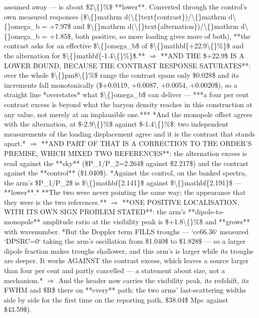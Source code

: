 \begin{description}
assumed away --- is about \$2\textbackslash\{\}\%\$ **lower**. Converted through the control's own measured responses (\$\textbackslash\{\}mathrm d(\textbackslash\{\}text\{contrast\})/\textbackslash\{\}mathrm d\textbackslash\{\}omega\_b = +7.97\$ and \$\textbackslash\{\}mathrm d(\textbackslash\{\}text\{alternation\})/\textbackslash\{\}mathrm d\textbackslash\{\}omega\_b = +1.85\$, both positive, so more loading gives more of both), **the contrast asks for an effective \$\textbackslash\{\}omega\_b\$ of \$\textbackslash\{\}mathbf\{+22.9\textbackslash\{\}\%\}\$ and the alternation for \$\textbackslash\{\}mathbf\{-1.4\textbackslash\{\}\%\}\$.** \ensuremath{\Rightarrow}  **AND THE \$+22.9\$ IS A LOWER BOUND, BECAUSE THE CONTRAST RESPONSE SATURATES**: over the whole \$\textbackslash\{\}pm8\textbackslash\{\}\%\$ range the contrast spans only \$0.028\$ and its increments fall monotonically (\$+0.0119, +0.0087, +0.0054, +0.0020\$), so a straight line *overstates* what \$\textbackslash\{\}omega\_b\$ can deliver --- ***a four per cent contrast excess is beyond what the baryon density reaches in this construction at any value, not merely at an implausible one.***  *And the monopole offset agrees with the alternation, at \$-2.9\textbackslash\{\}\%\$ against \$-1.4\textbackslash\{\}\%\$: two independent measurements of the loading displacement agree and it is the contrast that stands apart.* \ensuremath{\Rightarrow}  **AND PART OF THAT IS A CORRECTION TO THE ORDER'S PREMISE, WHICH MIXED TWO REFERENCES**: the alternation excess is read against the **sky** (\$P\_1/P\_2=2.264\$ against \$2.217\$) and the contrast against the **control** (\$1.040\$). *Against the control, on the banked spectra, the arm's \$P\_1/P\_2\$ is \$\textbackslash\{\}mathbf\{2.141\}\$ against \$\textbackslash\{\}mathbf\{2.191\}\$ --- **lower**.* **The two were never pointing the same way; the appearance that they were is the two references.** \ensuremath{\Rightarrow}  **ONE POSITIVE LOCALISATION, WITH ITS OWN SIGN PROBLEM STATED**: the arm's **dipole-to-monopole** amplitude ratio at the visibility peak is \$+1.8\textbackslash\{\}\%\$ and **grows** with wavenumber.  *But the Doppler term FILLS troughs --- `cc66.36` measured `DPSRC=0` taking the arm's oscillation from \$1.040\$ to \$1.828\$ --- so a larger dipole fraction makes troughs shallower, and this arm's is larger while its troughs are deeper. It works AGAINST the contrast excess, which leaves a source larger than four per cent and partly cancelled --- a statement about size, not a mechanism.* \ensuremath{\Rightarrow} And the header now carries the visibility peak, its redshift, its FWHM and \$R\$ there on **every** path: the two arms' last-scattering widths side by side for the first time on the reporting path, \$38.04\$ Mpc against \$43.59\$). 

\end{description}

